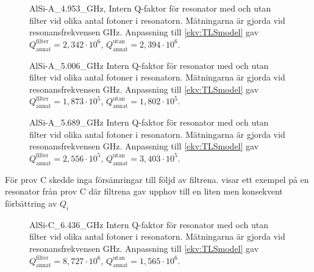 \documentclass[main.tex]{subfiles}
\begin{document}
\begin{figure}[H]
  \centering
  \setlength{}
  \setlength\figureheight{15em}
  
  \caption{AlSi-A\_4.953\_GHz, Intern Q-faktor för resonator med och utan filter vid olika antal fotoner i resonatorn. Mätningarna är gjorda vid resonansfrekvensen \unit[4,953]{GHz}. Anpassning till \ref{ekv:TLSmodel} gav $Q_{\text{annat}}^{\text{filter}}=2,342\cdot10^6$, $Q_{\text{annat}}^{\text{utan}}=2,394\cdot10^6$.} 
  \label{fig:A4.953}
\end{figure}

\begin{figure}[H]
  \centering
  \setlength{}
  \setlength\figureheight{15em}
  
  \caption{AlSi-A\_5.006\_GHz Intern Q-faktor för resonator med och utan filter vid olika antal fotoner i resonatorn. Mätningarna är gjorda vid resonansfrekvensen \unit[4,953]{GHz}. Anpassning till \ref{ekv:TLSmodel} gav $Q_{\text{annat}}^{\text{filter}}=1,873\cdot10^5$, $Q_{\text{annat}}^{\text{utan}}=1,802\cdot10^5$.}
  \label{fig:A5.006}
\end{figure}

\begin{figure}[H]
  \centering
  \setlength{}
  \setlength\figureheight{15em}
  
  \caption{AlSi-A\_5.689\_GHz Intern Q-faktor för resonator med och utan filter vid olika antal fotoner i resonatorn. Mätningarna är gjorda vid resonansfrekvensen \unit[4,953]{GHz}. Anpassning till \ref{ekv:TLSmodel} gav  $Q_{\text{annat}}^{\text{filter}}=2,556\cdot10^5$, $Q_{\text{annat}}^{\text{utan}}=3,403\cdot10^5$.}
  \label{fig:A5.689}
\end{figure}


För prov C skedde inga försämringar till följd av filtrena.  visar ett exempel på en resonator från prov C där filtrena gav upphov till en liten men konsekvent förbättring av $Q_i$

\begin{figure}[H]
  \centering
  \setlength{}
  \setlength\figureheight{15em}
  
  \caption{AlSi-C\_6.436\_GHz Intern Q-faktor för resonator med och utan filter vid olika antal fotoner i resonatorn. Mätningarna är gjorda vid resonansfrekvensen \unit[4,953]{GHz}. Anpassning till \ref{ekv:TLSmodel} gav $Q_{\text{annat}}^{\text{filter}}=8,727\cdot10^6$, $Q_{\text{annat}}^{\text{utan}}=1,565\cdot10^6$.}
  \label{fig:C6.436}
\end{figure}
\end{document}
